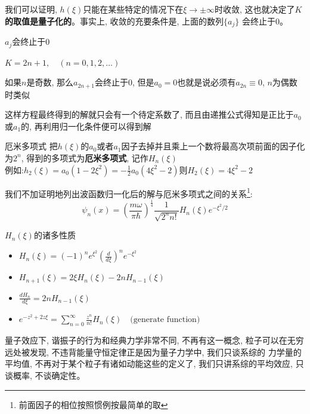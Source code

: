 \documentclass[a4paper,zihao=-4,linespread=1]{ctexrep}
\newenvironment{lequation}{\large\begin{equation}}{\end{equation}}
\begin{document}
    我们可以证明, $h(\xi)$只能在某些特定的情况下在$\xi \to \pm \infty$时收敛, 这也就决定了\textbf{$K$的取值是量子化的}。事实上, 收敛的充要条件是, 上面的数列$\{a_j\}$
    会终止于$0$。
    \begin{proposition}{$a_j$会终止于$0$}
        \begin{center}
            \begin{math}
            \displaystyle
            K=2n+1,\quad (n=0,1,2,\ldots)
            \end{math}
        \end{center}
        如果$n$是奇数, 那么$a_{2n+1}$会终止于$0$, 但是$a_0=0$也就是说必须有$a_{2n}\equiv 0$, $n$为偶数时类似
    \end{proposition}
    这样方程最终得到的解就只会有一个待定系数了, 而且由递推公式得知是正比于$a_0$或$a_1$的, 再利用归一化条件便可以得到解
    \begin{define}{厄米多项式}
        把$h(\xi)$的$a_0$或者$a_1$因子去掉并且乘上一个数将最高次项前面的因子化为$2^n$, 得到的多项式为\textbf{厄米多项式}, 记作$H_n(\xi)$\\
        例如:$h_2(\xi)=a_0(1-2\xi^2)=-\frac{1}{2}a_0(4\xi^2-2)$则$H_2(\xi)=4\xi^2-2$
    \end{define}
    我们不加证明地列出波函数归一化后的解与厄米多项式之间的关系\footnote{前面因子的相位按照惯例按最简单的取}:
    \begin{lequation}
        \boxed{
            \psi_n(x)=\left(\frac{m\omega}{\pi\hbar}\right)^{\frac{1}{4}}\frac{1}{\sqrt{2^nn!}}H_n(\xi)e^{-\xi^2/2}
        }
    \end{lequation}
    \begin{theorem}{$H_n(\xi)$的诸多性质}
        \begin{itemize}
            \item 
                \begin{math}
                    \displaystyle
                    H_n(\xi)=(-1)^ne^{\xi^2}\left(\frac{d}{d\xi}\right)^ne^{-\xi^2}
                \end{math}
            \item 
                \begin{math}
                    \displaystyle
                    H_{n+1}(\xi)=2\xi H_n(\xi)-2nH_{n-1}(\xi)
                \end{math}
            \item 
                \begin{math}
                    \displaystyle
                    \frac{d H_n}{d\xi}=2n H_{n-1}(\xi)
                \end{math}
            \item 
                \begin{math}
                    \displaystyle
                    e^{-z^2+2z\xi}=\sum_{n=0}^{\infty}\frac{z^n}{n!}H_n(\xi)\quad\text{(generate function)}
                \end{math}
        \end{itemize}
    \end{theorem}
    量子效应下, 谐振子的行为和经典力学非常不同, 不再有这一概念, 粒子可以在无穷远处被发现, 不违背能量守恒定律正是因为量子力学中, 我们只谈系综的
    力学量的平均值, 不再对于某个粒子有诸如动能这些的定义了, 我们只讲系综的平均效应, 只谈概率, 不谈确定性。
\end{document}
